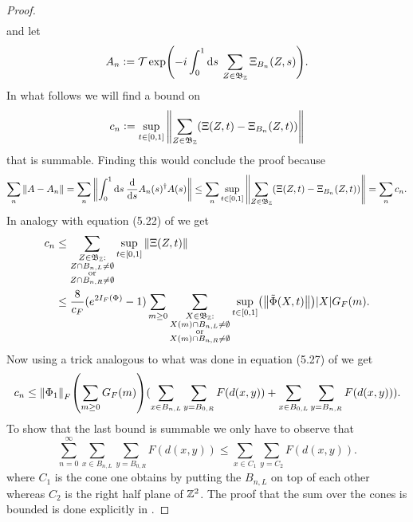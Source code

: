 \documentclass[12pt,a4paper,twoside]{article}
\numberwithin{equation}{section}
\begin{document}
\begin{proof}
\begin{align}
	\end{align}
	and let
	\begin{equation}
		A_n\vcentcolon= \mathcal{T}\exp(-i\int_0^1 \text{d} s\: \sum_{Z\in\mathfrak{B}_{\mathbb Z}}\Xi_{B_n}(Z,s)).
	\end{equation}
	In what follows we will find a bound on
	\begin{equation}
		c_n\vcentcolon= \sup_{t\in[0,1]}\norm{\sum_{Z\in\mathfrak{B}_\mathbb Z}(\Xi(Z,t)-\Xi_{B_n}(Z,t))}
	\end{equation}
	that is summable. Finding this would conclude the proof because
	\begin{equation}
		\sum_n\norm{A-A_n}=\sum_n\norm{\int_0^1\text{d} s\: \frac{\text{d}}{\text{d} s}A_{n}(s)^\dagger A(s)}\leq \sum_n \sup_{t\in[0,1]}\norm{\sum_{Z\in\mathfrak{B}_\mathbb Z}(\Xi(Z,t)-\Xi_{B_n}(Z,t))}=\sum_n c_n.
	\end{equation}
	In analogy with equation (5.22) of \cite{ogata2021h3gmathbb} we get
	\begin{align}
		\label{eq:c_n_Bound1D}
		c_n&\leq \sum_{\substack{Z\in\mathfrak{B}_{\ZZ}:\\Z\cap B_{n,L}\neq\emptyset\\\text{or}\\Z\cap B_{n,R}\neq\emptyset}}\sup_{t\in[0,1]}\norm{\Xi(Z,t)}\\
		&\leq \frac{8}{c_F}(e^{2I_F(\Phi)}-1) \sum_{m\geq 0}\sum_{\substack{X\in\mathfrak{B}_{\ZZ}:\\X(m)\cap B_{n,L}\neq\emptyset\\\text{or}\\X(m)\cap B_{n,R}\neq\emptyset}}\sup_{t\in[0,1]}\left(\norm{\tilde{\Phi}(X,t)}\right)\abs{X}G_F(m).
	\end{align}
	Now using a trick analogous to what was done in equation (5.27) of \cite{ogata2021h3gmathbb} we get
	\begin{equation}
		c_n\leq \norm{\Phi_1}_F\left(\sum_{m\geq 0}G_F(m)\right)(\sum_{x\in B_{n,L}}\sum_{y=B_{0,R}}F(d(x,y))+\sum_{x\in B_{0,L}}\sum_{y=B_{n,R}}F(d(x,y))).
	\end{equation}
	To show that the last bound is summable we only have to observe that
	\begin{equation}
		\sum_{n=0}^\infty\sum_{x\in B_{n,L}}\sum_{y=B_{0,R}}F(d(x,y))\leq \sum_{x\in C_1}\sum_{y=C_2}F(d(x,y)).
	\end{equation}
	where $C_1$ is the cone one obtains by putting the $B_{n,L}$ on top of each other whereas $C_2$ is the right half plane of $\mathbb Z^2$. The proof that the sum over the cones is bounded is done explicitly in \cite{ogata2021h3gmathbb}.
\end{proof}
\end{document}
